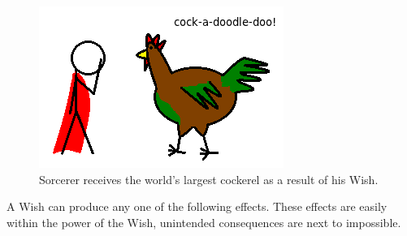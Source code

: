 \begin{figure}
  \caption{Sorcerer receives the world's largest cockerel as a result of his Wish.}
  \centering
    \includegraphics{Pics/Wish.png}
\end{figure}

A Wish can produce any one of the following effects. 
These effects are easily within the power of the Wish, unintended consequences are next to impossible.
